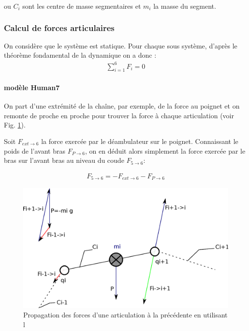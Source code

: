 \documentclass[a4paper, 10pt ]{article}
\begin{document}
ou $C_i$ sont les centre de masse segmentaires et $m_i$ la masse du segment.

\subsubsection{Calcul de forces articulaires}

On considère que le système est statique. Pour chaque sous système, d'après le théorème fondamental de la dynamique on a donc :
\begin{align}
\sum_{i=1}^{6}F_i=0
\end{align}


\paragraph{modèle Human7}
On part d'une extrémité de la chaîne, par exemple, de  la force au poignet et on remonte de proche en proche pour trouver la force à chaque articulation (voir Fig. \ref{fig:propagationForce}).

Soit $F_{ext\rightarrow 6}$ la force exercée par le déambulateur sur le poignet. Connaissant le poids de l'avant bras  $F_{P\rightarrow 6}$, on en déduit alors simplement la force exercée par le bras sur l'avant bras au niveau du coude  $F_{5\rightarrow 6}$: 

\begin{align}
F_{5\rightarrow 6} = - F_{ext\rightarrow 6} -F_{P\rightarrow 6}
\end{align}
\begin{figure}[h]
\centering
\includegraphics[width=0.8\columnwidth]{images/model/propagationForce.eps}
\caption{Propagation des forces d'une articulation à la précédente en utilisant l}
\label{fig:propagationForce}
\end{figure}
\end{document}
